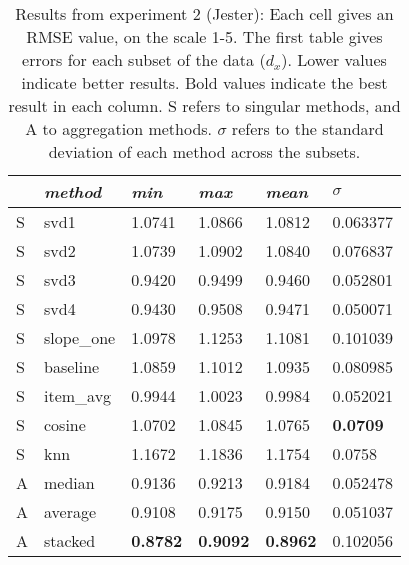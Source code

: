\begin{table}[p]
  \begin{tabular*}{\textwidth}{ l p{3cm} p{2cm} p{2cm} p{2cm} p{2cm} }
    \toprule
      ~ & \emph{method} & 
      \emph{min} & \emph{max} & \emph{mean} & $\sigma$\\
    \midrule
S & svd1       &  1.0741  &  1.0866  &  1.0812  &  0.063377  \\
S & svd2       &  1.0739  &  1.0902  &  1.0840  &  0.076837  \\
S & svd3       &  0.9420  &  0.9499  &  0.9460  &  0.052801  \\
S & svd4       &  0.9430  &  0.9508  &  0.9471  &  0.050071  \\
S & slope\_one &  1.0978  &  1.1253  &  1.1081  &  0.101039  \\
S & baseline   &  1.0859  &  1.1012  &  1.0935  &  0.080985  \\
S & item\_avg  &  0.9944  &  1.0023  &  0.9984  &  0.052021  \\
S & cosine     &  1.0702  &  1.0845  &  1.0765  &  \textbf{0.0709}    \\
S & knn        &  1.1672  &  1.1836  &  1.1754  &  0.0758    \\
\midrule
A & median   &  0.9136  &  0.9213  &  0.9184  &  0.052478  \\
A & average  &  0.9108  &  0.9175  &  0.9150  &  0.051037  \\
A & stacked  &  \textbf{0.8782}  &  \textbf{0.9092}  &  \textbf{0.8962}  &  0.102056  \\
    \bottomrule
  \end{tabular*}
  \vspace{2em}

  \caption[Results from Experiment 2]{
    Results from experiment 2 (Jester):
    Each cell gives an RMSE value, on the scale 1-5.
    The first table gives errors for each subset of the data ($d_x$).
    Lower values indicate better results.
    Bold values indicate the best result in each column.
    S refers to singular methods, and A to aggregation methods.
    $\sigma$ refers to the standard deviation of each method across the subsets.
  }
  \label{table:results:e2}
\end{table}

